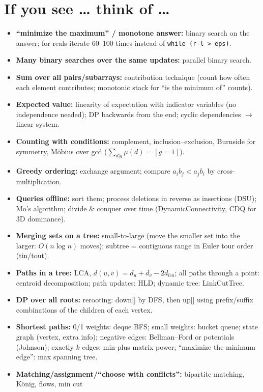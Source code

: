 \section{If you see \dots{} think of \dots}
\begin{itemize}
	\item \textbf{``minimize the maximum'' / monotone answer:} binary search on the answer;
		for reals iterate 60--100 times instead of \texttt{while (r-l > eps)}.
	\item \textbf{Many binary searches over the same updates:} parallel binary search.
	\item \textbf{Sum over all pairs/subarrays:} contribution technique (count how often each
		element contributes; monotonic stack for ``is the minimum of'' counts).
	\item \textbf{Expected value:} linearity of expectation with indicator variables (no independence needed);
		DP backwards from the end; cyclic dependencies $\to$ linear system.
	\item \textbf{Counting with conditions:} complement, inclusion--exclusion, Burnside for symmetry,
		Möbius over gcd ($\sum_{d|g}\mu(d) = [g = 1]$).
	\item \textbf{Greedy ordering:} exchange argument; compare $a_ib_j < a_jb_i$ by cross-multiplication.
	\item \textbf{Queries offline:} sort them; process deletions in reverse as insertions (DSU);
		Mo's algorithm; divide \& conquer over time (DynamicConnectivity, CDQ for 3D dominance).
	\item \textbf{Merging sets on a tree:} small-to-large (move the smaller set into the larger: $O(n\log n)$
		moves); subtree = contiguous range in Euler tour order (tin/tout).
	\item \textbf{Paths in a tree:} LCA, $d(u,v) = d_u + d_v - 2d_{lca}$; all paths through a point:
		centroid decomposition; path updates: HLD; dynamic tree: LinkCutTree.
	\item \textbf{DP over all roots:} rerooting: down[] by DFS, then up[] using prefix/suffix
		combinations of the children of each vertex.
	\item \textbf{Shortest paths:} 0/1 weights: deque BFS; small weights: bucket queue;
		state graph (vertex, extra info); negative edges: Bellman--Ford or potentials (Johnson);
		exactly $k$ edges: min-plus matrix power; ``maximize the minimum edge'': max spanning tree.
	\item \textbf{Matching/assignment/``choose with conflicts'':} bipartite matching, König, flows, min cut

\end{itemize}
